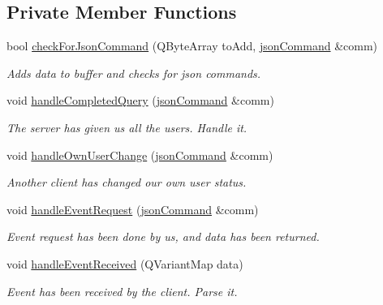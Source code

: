 \subsection*{Private Member Functions}
\begin{DoxyCompactItemize}
\item 
bool \hyperlink{classclient_1_1cls_server_conn_a8fc1a3ef72ba0480d521781f84983afe}{check\-For\-Json\-Command} (Q\-Byte\-Array to\-Add, \hyperlink{class_k4_u_1_1json_command}{json\-Command} \&comm)
\begin{DoxyCompactList}\small\item\em Adds data to buffer and checks for json commands. \end{DoxyCompactList}\item 
void \hyperlink{classclient_1_1cls_server_conn_a034a72332abdeeb8dbd9483954a235dd}{handle\-Completed\-Query} (\hyperlink{class_k4_u_1_1json_command}{json\-Command} \&comm)
\begin{DoxyCompactList}\small\item\em The server has given us all the users. Handle it. \end{DoxyCompactList}\item 
void \hyperlink{classclient_1_1cls_server_conn_a2f4257ed2b9677919567a060fb31887b}{handle\-Own\-User\-Change} (\hyperlink{class_k4_u_1_1json_command}{json\-Command} \&comm)
\begin{DoxyCompactList}\small\item\em Another client has changed our own user status. \end{DoxyCompactList}\item 
void \hyperlink{classclient_1_1cls_server_conn_a25abb840bb0764068d9a72dfb1e403b5}{handle\-Event\-Request} (\hyperlink{class_k4_u_1_1json_command}{json\-Command} \&comm)
\begin{DoxyCompactList}\small\item\em Event request has been done by us, and data has been returned. \end{DoxyCompactList}\item 
void \hyperlink{classclient_1_1cls_server_conn_ad5d3a03440fdec33270247486fb5500c}{handle\-Event\-Received} (Q\-Variant\-Map data)
\begin{DoxyCompactList}\small\item\em Event has been received by the client. Parse it. \end{DoxyCompactList}\end{DoxyCompactItemize}
